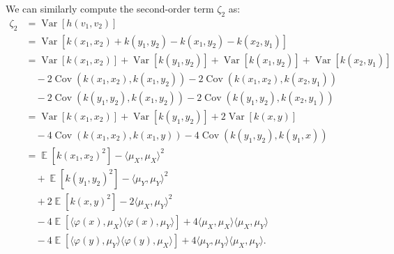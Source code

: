 \documentclass{article}
\DeclareMathOperator{\E}{\mathbb{E}}
\DeclareMathOperator{\Var}{Var}
\DeclareMathOperator{\Cov}{Cov}
\begin{document}
We can similarly compute the second-order term $\zeta_2$ as:
\begin{align*}
\zeta_2
  &= \Var\left[ h(v_1, v_2) \right]
\\&= \Var\left[ k(x_1, x_2) + k(y_1, y_2) - k(x_1, y_2) - k(x_2, y_1) \right]
\\&= \Var\left[ k(x_1, x_2) \right]
   + \Var\left[ k(y_1, y_2) \right]
   + \Var\left[ k(x_1, y_2) \right]
   + \Var\left[ k(x_2, y_1) \right]
\\&\quad
   - 2 \Cov\left( k(x_1, x_2), k(x_1, y_2) \right)
   - 2 \Cov\left( k(x_1, x_2), k(x_2, y_1) \right)
\\&\quad
   - 2 \Cov\left( k(y_1, y_2), k(x_1, y_2) \right)
   - 2 \Cov\left( k(y_1, y_2), k(x_2, y_1) \right)
\\&= \Var\left[ k(x_1, x_2) \right]
   + \Var\left[ k(y_1, y_2) \right]
   + 2 \Var\left[ k(x, y) \right]
\\&\quad
   - 4 \Cov\left( k(x_1, x_2), k(x_1, y) \right)
   - 4 \Cov\left( k(y_1, y_2), k(y_1, x) \right)
\\&= \E\left[ k(x_1, x_2)^2 \right] - \langle \mu_X, \mu_X \rangle^2
  \\&\quad
   + \E\left[ k(y_1, y_2)^2 \right] - \langle \mu_Y, \mu_Y \rangle^2
\\&\quad
   + 2 \E\left[ k(x, y)^2 \right] - 2 \langle \mu_X, \mu_Y \rangle^2
\\&\quad
   - 4 \E\left[ \langle \varphi(x), \mu_X \rangle \langle \varphi(x), \mu_Y \rangle \right]
   + 4 \langle \mu_X, \mu_X \rangle \langle \mu_X, \mu_Y \rangle
\\&\quad
   - 4 \E\left[ \langle \varphi(y), \mu_Y \rangle \langle \varphi(y), \mu_X \rangle \right]
   + 4 \langle \mu_Y, \mu_Y \rangle \langle \mu_X, \mu_Y \rangle
.\end{align*}
\end{document}
